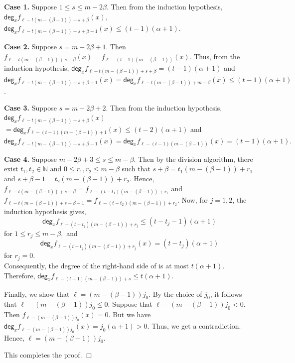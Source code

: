 \documentclass[12pt,reqno]{amsart}
\renewcommand{\deg}{\mathsf{deg}}
\renewcommand{\leq}{\leqslant}
\numberwithin{thm}{section}
\theoremstyle{definition}
\numberwithin{equation}{thm}
\renewenvironment{proof}{\par\noindent {\em Proof:}}{\hfill$\Box$\medskip}
\theoremstyle{plain}
\begin{document}
\begin{proof}
\medskip
\noindent
\textbf{Case 1.}  Suppose $1\leq s\leq m-2\beta$. Then from the induction hypothesis, $\deg_x f_{\ell-t(m-(\beta-1))+s+\beta}(x)$, $\deg_x f_{\ell-t(m-(\beta-1))+s+\beta-1}(x)\leq (t-1)(\alpha+1)$.

\medskip
\noindent
\textbf{Case 2.} Suppose $s=m-2\beta+1$. Then $f_{\ell-t(m-(\beta-1))+s+\beta}(x)=f_{\ell-(t-1)(m-(\beta-1))}(x)$. Thus, from the induction hypothesis, $\deg_x f_{\ell-t(m-(\beta-1))+s+\beta}= (t-1)(\alpha +1)$ and $\deg_x f_{\ell-t(m-(\beta-1))+s+\beta-1}(x)=\deg_x f_{\ell-t(m-(\beta-1))+m-\beta}(x)\leq(t-1)(\alpha+1)$.

\medskip
\noindent
\textbf{Case 3.} Suppose $s=m-2\beta+2$. Then from the induction hypothesis, $\deg_x f_{\ell-t(m-(\beta-1))+s+\beta}(x)$ $=\deg_x f_{\ell-(t-1)(m-(\beta-1))+1}(x)\leq (t-2)(\alpha+1)$ and \\ $\deg_x f_{\ell-t(m-(\beta-1))+s+\beta-1}(x)=\deg_x f_{\ell-(t-1)(m-(\beta-1))}(x)=(t-1)(\alpha+1).$ 

\medskip
\noindent
\textbf{Case 4.} Suppose $m-2\beta+3\leq s\leq m-\beta$. Then by the division algorithm, there exist $t_1,t_2\in \mathbb{N}$ and $0\leq r_1 ,r_2\leq m-\beta$ such that $s+\beta=t_1(m-(\beta-1))+r_1$ and $s+\beta-1=t_2(m-(\beta-1))+r_2.$ Hence, $f_{\ell-t(m-(\beta-1))+s+\beta}=f_{\ell-(t-t_1)(m-(\beta-1))+r_1}$ and $f_{\ell-t(m-(\beta-1))+s+\beta-1}=f_{\ell-(t-t_2)(m-(\beta-1))+r_2}.$ Now, for $j=1,2$, the induction hypothesis gives, $$\deg_x f_{\ell-(t-t_j)(m-(\beta-1))+r_j} \leq (t-t_j-1)(\alpha+1)$$ for $1\leq r_j\leq m-\beta,$ and $$\deg_x f_{\ell-(t-t_j)(m-(\beta-1))+r_j}(x)=(t-t_j)(\alpha+1)$$ for $r_j=0.$\\
Consequently, the degree of the right-hand side of  is at most $t(\alpha+1)$. Therefore, $\deg_x f_{\ell-(t+1)(m-(\beta-1))+s}\leq t(\alpha+1).$

\medskip

\noindent Finally, we show that $\ell=(m-(\beta-1))j_0$. By the choice of $j_0$, it follows that $\ell-(m-(\beta-1))j_0\le0$. 
Suppose that $\ell-(m-(\beta-1))j_0<0$. Then $f_{\ell-(m-(\beta-1))j_0}(x)=0$. But we have $\deg_x f_{\ell-(m-(\beta-1))j_0}(x)=j_0(\alpha+1)>0.$ Thus, we get a contradiction. Hence, $\ell=(m-(\beta-1))j_0$.
\medskip

\noindent This completes the proof.
\end{proof}
\end{document}
